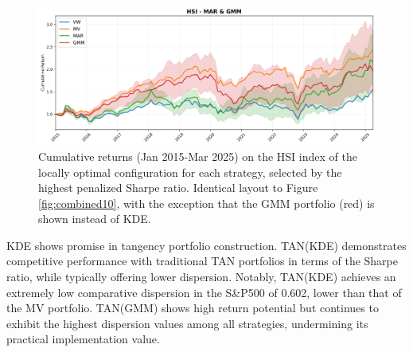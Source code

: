 \begin{figure}[H]
  \begin{center}
  \begin{minipage}{1\textwidth}
    \centering
    \includegraphics[width=\textwidth]{images/40_11.png}
  \end{minipage}
  \caption[Local best configuration - HSI - Cumulative returns]{Cumulative returns (Jan 2015-Mar 2025) on the HSI index of the locally optimal configuration for each strategy, selected by the highest penalized Sharpe ratio. Identical layout to Figure \ref{fig:combined10}, with the exception that the GMM portfolio (red) is shown instead of KDE.}
  \label{fig:combined11}
  \end{center}
  \end{figure}

KDE shows promise in tangency portfolio construction. TAN(KDE) demonstrates competitive performance with traditional TAN portfolios in terms of the Sharpe ratio, while typically offering lower dispersion. Notably, TAN(KDE) achieves an extremely low comparative dispersion in the S\&P500 of 0.602, lower than that of the MV portfolio. TAN(GMM) shows high return potential but continues to exhibit the highest dispersion values among all strategies, undermining its practical implementation value.

